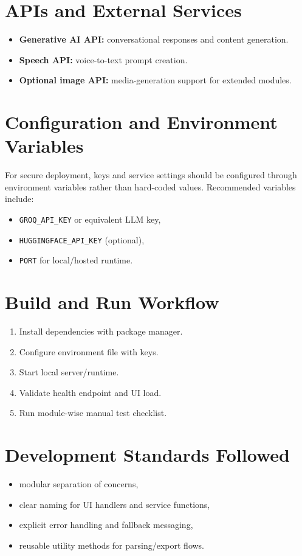 \documentclass[12pt,a4paper]{report}
\begin{document}
\section{APIs and External Services}
\begin{itemize}
  \item \textbf{Generative AI API:} conversational responses and content generation.
  \item \textbf{Speech API:} voice-to-text prompt creation.
  \item \textbf{Optional image API:} media-generation support for extended modules.
\end{itemize}

\section{Configuration and Environment Variables}
For secure deployment, keys and service settings should be configured through environment variables rather than hard-coded values. Recommended variables include:
\begin{itemize}
  \item \texttt{GROQ\_API\_KEY} or equivalent LLM key,
  \item \texttt{HUGGINGFACE\_API\_KEY} (optional),
  \item \texttt{PORT} for local/hosted runtime.
\end{itemize}

\section{Build and Run Workflow}
\begin{enumerate}
  \item Install dependencies with package manager.
  \item Configure environment file with keys.
  \item Start local server/runtime.
  \item Validate health endpoint and UI load.
  \item Run module-wise manual test checklist.
\end{enumerate}

\section{Development Standards Followed}
\begin{itemize}
  \item modular separation of concerns,
  \item clear naming for UI handlers and service functions,
  \item explicit error handling and fallback messaging,
  \item reusable utility methods for parsing/export flows.
\end{itemize}
\end{document}
